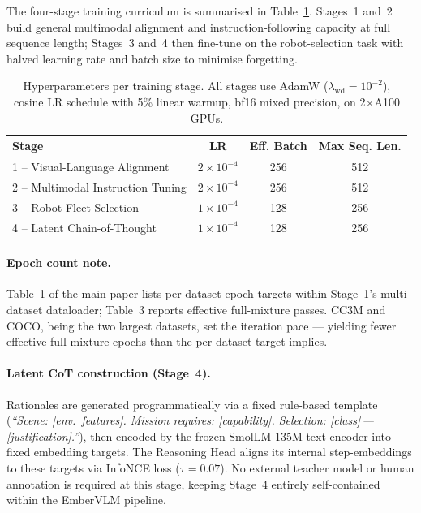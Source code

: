 \documentclass[runningheads]{llncs}
\begin{document}
\medskip
The four-stage training curriculum is summarised in Table~\ref{tab:hparams}. Stages~1
and~2 build general multimodal alignment and instruction-following capacity at full
sequence length; Stages~3 and~4 then fine-tune on the robot-selection task with halved
learning rate and batch size to minimise forgetting.

\begin{table}[ht]
\centering
\caption{Hyperparameters per training stage. All stages use AdamW
($\lambda_{\text{wd}}\!=\!10^{-2}$), cosine LR schedule with 5\% linear warmup,
bf16 mixed precision, on 2$\times$A100 GPUs.}
\label{tab:hparams}
\setlength{\tabcolsep}{6pt}
\begin{tabular}{lccc}
\toprule
Stage & LR & Eff. Batch & Max Seq. Len. \\
\midrule
1 -- Visual-Language Alignment     & $2\!\times\!10^{-4}$ & 256 & 512 \\
2 -- Multimodal Instruction Tuning & $2\!\times\!10^{-4}$ & 256 & 512 \\
3 -- Robot Fleet Selection         & $1\!\times\!10^{-4}$ & 128 & 256 \\
4 -- Latent Chain-of-Thought       & $1\!\times\!10^{-4}$ & 128 & 256 \\
\bottomrule
\end{tabular}
\end{table}

\paragraph{Epoch count note.}
Table~1 of the main paper lists per-dataset epoch targets within Stage~1's
multi-dataset dataloader; Table~3 reports effective full-mixture passes. CC3M and
COCO, being the two largest datasets, set the iteration pace — yielding fewer
effective full-mixture epochs than the per-dataset target implies.

\paragraph{Latent CoT construction (Stage~4).}
Rationales are generated programmatically via a fixed rule-based template
(\emph{``Scene: [env.\ features]. Mission requires: [capability]. Selection:
[class]\,—\,[justification].''}), then encoded by the frozen SmolLM-135M text
encoder into fixed embedding targets. The Reasoning Head aligns its internal
step-embeddings to these targets via InfoNCE loss ($\tau\!=\!0.07$). No external
teacher model or human annotation is required at this stage, keeping Stage~4
entirely self-contained within the EmberVLM pipeline.
\end{document}
